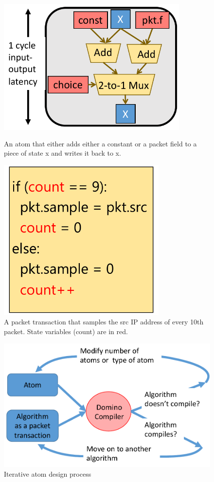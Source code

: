 \begin{figure}[!t]
\begin{minipage}{0.48\textwidth}
\centering
\vspace{0.38in}
\includegraphics[width=0.85\textwidth]{atom.pdf}
\caption{An atom that either adds either a constant or a packet field to a
piece of state x and writes it back to x.}
\label{fig:simple_atom}
\end{minipage}
\hfill
\begin{minipage}{0.48\textwidth}
\centering
\includegraphics[width=0.75\textwidth]{packet_transaction.pdf}
\caption{A packet transaction that samples the src IP address of every 10th
packet. State variables (count) are in red.}
\label{fig:simple_transaction}
\end{minipage}
\end{figure}

\begin{figure}
\centering
\includegraphics[width=0.4\columnwidth]{iterative_design_process.pdf}
\caption{Iterative atom design process}
\label{fig:iterative_design}
\end{figure}


